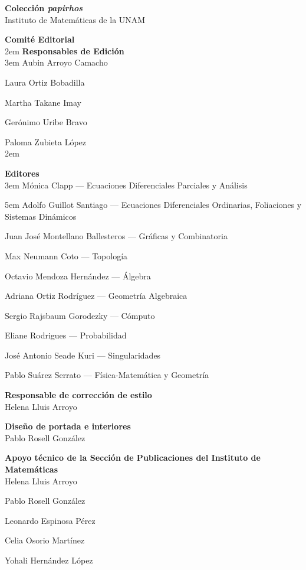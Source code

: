 
\small\parindent0pt\parskip0pt
\pagestyle{empty}
\textbf{Colección {\itshape papirhos}}\\[0pt]
Instituto de Matemáticas de la UNAM

\vfill

\textbf{Comité Editorial}\\[10pt]
\parindent2em
\indent
\textbf{Responsables de Edición}\\[3pt]
\parindent3em
\indent
Aubin Arroyo Camacho

Laura Ortiz Bobadilla

Martha Takane Imay

Gerónimo Uribe Bravo

Paloma Zubieta López\\[10pt]

\parindent2em

\textbf{Editores}\\[3pt]
\parindent3em
\indent
Mónica Clapp --- Ecuaciones Diferenciales Parciales y Análisis

\hangindent5em Adolfo Guillot Santiago --- Ecuaciones Diferenciales Ordinarias,
Foliaciones y\\ Sistemas Dinámicos

Juan José Montellano Ballesteros --- Gráficas y Combinatoria

Max Neumann Coto --- Topología

Octavio Mendoza Hernández --- Álgebra

Adriana Ortiz Rodríguez --- Geometría Algebraica

Sergio Rajsbaum Gorodezky --- Cómputo

Eliane Rodrigues --- Probabilidad

José Antonio Seade Kuri --- Singularidades

Pablo Suárez Serrato --- Física-Matemática y Geometría

\vfill

\parindent0pt

\textbf{Responsable de corrección de estilo}\\[0pt]
Helena Lluis Arroyo

\vfill

\textbf{Diseño de portada e interiores}\\[0pt]
Pablo Rosell González

\vfill

\textbf{Apoyo técnico de la Sección de Publicaciones del Instituto de Matemáticas}\\[0pt]
Helena Lluis Arroyo

Pablo Rosell González

Leonardo Espinosa Pérez

Celia Osorio Martínez

Yohali Hernández López


